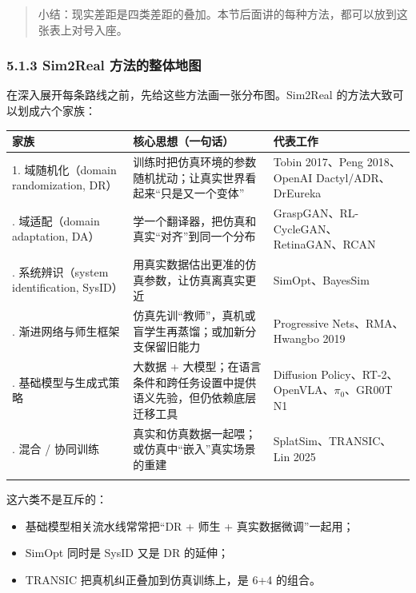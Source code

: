 \documentclass[
  chinese,
]{ctexart}
\providecommand{\tightlist}{%
  \setlength{\itemsep}{0pt}\setlength{\parskip}{0pt}}
\begin{document}
\begin{quote}
小结：现实差距是四类差距的叠加。本节后面讲的每种方法，都可以放到这张表上对号入座。
\end{quote}

\subsubsection{5.1.3 Sim2Real
方法的整体地图}\label{sim2real-ux65b9ux6cd5ux7684ux6574ux4f53ux5730ux56fe}

在深入展开每条路线之前，先给这些方法画一张分布图。Sim2Real
的方法大致可以划成六个家族：

\begin{center}
\begin{tabular}{@{}>{\raggedright\arraybackslash}p{} >{\raggedright\arraybackslash}p{} >{\raggedright\arraybackslash}p{}@{}}
\toprule\noalign{}
家族 & 核心思想（一句话） & 代表工作 \\
\midrule\noalign{}
1. 域随机化（domain randomization, DR） & 训练时把仿真环境的参数随机扰动；让真实世界看起来``只是又一个变体'' & Tobin 2017、Peng 2018、OpenAI Dactyl/ADR、DrEureka \\
2. 域适配（domain adaptation, DA） & 学一个翻译器，把仿真和真实``对齐''到同一个分布 & GraspGAN、RL-CycleGAN、RetinaGAN、RCAN \\
3. 系统辨识（system identification, SysID） & 用真实数据估出更准的仿真参数，让仿真离真实更近 & SimOpt、BayesSim \\
4. 渐进网络与师生框架 & 仿真先训``教师''，真机或盲学生再蒸馏；或加新分支保留旧能力 & Progressive Nets、RMA、Hwangbo 2019 \\
5. 基础模型与生成式策略 & 大数据 + 大模型；在语言条件和跨任务设置中提供语义先验，但仍依赖底层迁移工具 & Diffusion Policy、RT-2、OpenVLA、\(\pi_0\)、GR00T N1 \\
6. 混合 / 协同训练 & 真实和仿真数据一起喂；或仿真中``嵌入''真实场景的重建 & SplatSim、TRANSIC、Lin 2025 \\
\bottomrule\noalign{}
\end{tabular}
\end{center}

这六类不是互斥的：

\begin{itemize}
\tightlist
\item
  基础模型相关流水线常常把``DR + 师生 + 真实数据微调''一起用；
\item
  SimOpt 同时是 SysID 又是 DR 的延伸；
\item
  TRANSIC 把真机纠正叠加到仿真训练上，是 6+4 的组合。
\end{itemize}
\end{document}
